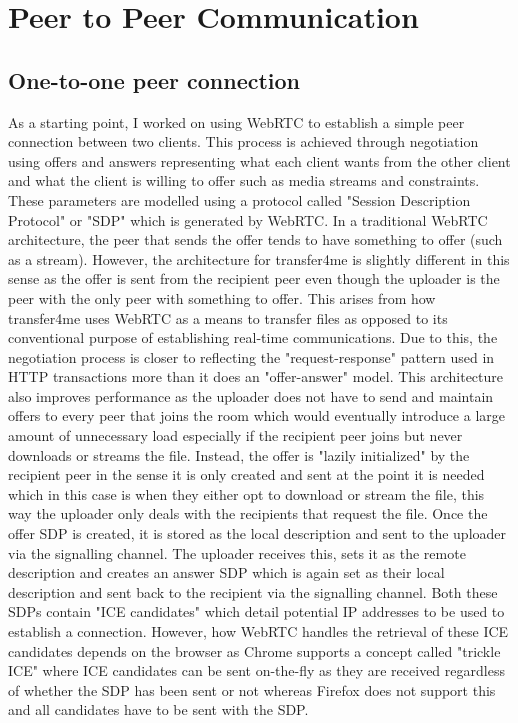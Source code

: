 \documentclass[]{report}
\begin{document}
		\section{Peer to Peer Communication}
			\subsection{One-to-one peer connection}
			As a starting point, I worked on using WebRTC to establish a simple peer connection between two clients. This process is achieved through negotiation using offers and answers representing what each client wants from the other client and what the client is willing to offer such as media streams and constraints. These parameters are modelled using a protocol called "Session Description Protocol" or "SDP" which is generated by WebRTC. In a traditional WebRTC architecture, the peer that sends the offer tends to have something to offer (such as a stream). However, the architecture for transfer4me is slightly different in this sense as the offer is sent from the recipient peer even though the uploader is the peer with the only peer with something to offer. This arises from how transfer4me uses WebRTC as a means to transfer files as opposed to its conventional purpose of establishing real-time communications. Due to this, the negotiation process is closer to reflecting the "request-response" pattern used in HTTP transactions more than it does an "offer-answer" model. This architecture also improves performance as the uploader does not have to send and maintain offers to every peer that joins the room which would eventually introduce a large amount of unnecessary load especially if the recipient peer joins but never downloads or streams the file. Instead, the offer is "lazily initialized" by the recipient peer in the sense it is only created and sent at the point it is needed which in this case is when they either opt to download or stream the file, this way the uploader only deals with the recipients that request the file. Once the offer SDP is created, it is stored as the local description and sent to the uploader via the signalling channel. The uploader receives this, sets it as the remote description and creates an answer SDP which is again set as their local description and sent back to the recipient via the signalling channel. Both these SDPs contain "ICE candidates" which detail potential IP addresses to be used to establish a connection. However, how WebRTC handles the retrieval of these ICE candidates depends on the browser as Chrome supports a concept called "trickle ICE" where ICE candidates can be sent on-the-fly as they are received regardless of whether the SDP has been sent or not whereas Firefox does not support this and all candidates have to be sent with the SDP. 
			
\end{document}
